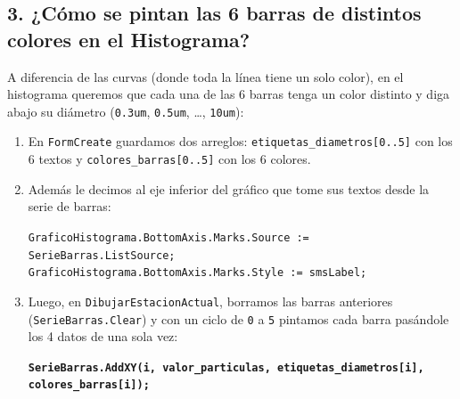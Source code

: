 \documentclass[11pt,a4paper]{article}
\begin{document}
\subsection{3. ¿Cómo se pintan las 6 barras de distintos colores en el Histograma?}
A diferencia de las curvas (donde toda la línea tiene un solo color), en el histograma queremos que cada una de las 6 barras tenga un color distinto y diga abajo su diámetro (\texttt{0.3um}, \texttt{0.5um}, \dots, \texttt{10um}):
\begin{enumerate}[leftmargin=1.5em]
    \item En \texttt{FormCreate} guardamos dos arreglos: \texttt{etiquetas\_diametros[0..5]} con los 6 textos y \texttt{colores\_barras[0..5]} con los 6 colores.
    \item Además le decimos al eje inferior del gráfico que tome sus textos desde la serie de barras:
    \begin{center}
    \texttt{GraficoHistograma.BottomAxis.Marks.Source := SerieBarras.ListSource;}\\
    \texttt{GraficoHistograma.BottomAxis.Marks.Style := smsLabel;}
    \end{center}
    \item Luego, en \texttt{DibujarEstacionActual}, borramos las barras anteriores (\texttt{SerieBarras.Clear}) y con un ciclo de \texttt{0} a \texttt{5} pintamos cada barra pasándole los 4 datos de una sola vez:
    \begin{center}
    \textbf{\texttt{SerieBarras.AddXY(i, valor\_particulas, etiquetas\_diametros[i], colores\_barras[i]);}}
    \end{center}
\end{enumerate}
\end{document}

